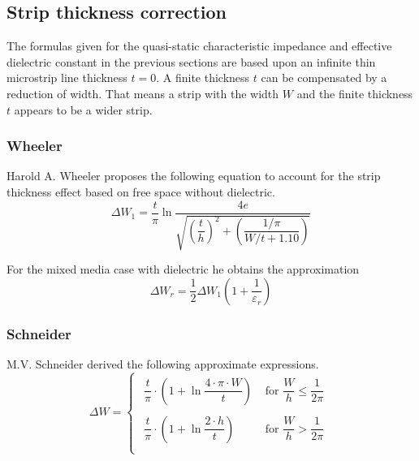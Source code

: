 \documentclass[10pt]{report}
\begin{document}
\subsection{Strip thickness correction}

The formulas given for the quasi-static characteristic impedance and
effective dielectric constant in the previous sections are based upon
an infinite thin microstrip line thickness $t = 0$.  A finite
thickness $t$ can be compensated by a reduction of width.  That means
a strip with the width $W$ and the finite thickness $t$ appears to be
a wider strip.

\subsubsection{Wheeler}

Harold A. Wheeler \cite{Wheeler} proposes the following equation to
account for the strip thickness effect based on free space without
dielectric.
\begin{equation}
\Delta W_1 = \dfrac{t}{\pi} \ln{\dfrac{4 e}{\sqrt{\left(\dfrac{t}{h}\right)^2 + \left(\dfrac{1/\pi}{W/t + 1.10}\right)}}}
\end{equation}

For the mixed media case with dielectric he obtains the approximation
\begin{equation}
\Delta W_r = \dfrac{1}{2} \Delta W_1 \left(1 + \dfrac{1}{\varepsilon_r}\right)
\end{equation}

\subsubsection{Schneider}

M.V. Schneider \cite{Schneider} derived the following approximate
expressions.
\begin{equation}
\Delta W =
\begin{cases}
\begin{array}{ll}
\dfrac{t}{\pi}\cdot\left(1 + \ln{\dfrac{4\cdot\pi\cdot W}{t}}\right) & \textrm{ for } \dfrac{W}{h} \le \dfrac{1}{2\pi}\\
&\\
\dfrac{t}{\pi}\cdot\left(1 + \ln{\dfrac{2\cdot h}{t}}\right) & \textrm{ for } \dfrac{W}{h} > \dfrac{1}{2\pi}\\
\end{array}
\end{cases}
\end{equation}
\end{document}
